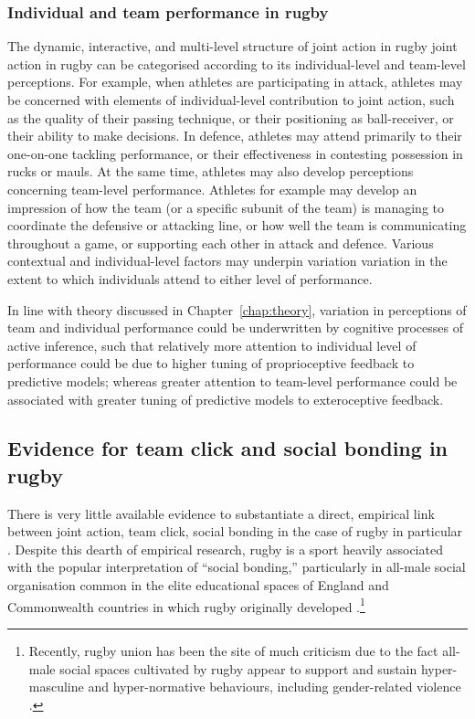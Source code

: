 \begin{CJK}{UTF8}{gbsn}
\subsubsection{Individual and team performance in rugby}

The dynamic, interactive, and multi-level structure of joint action in rugby  joint action in rugby can be categorised according to its individual-level and team-level perceptions.  For example, when athletes are participating in attack, athletes may be concerned with elements of individual-level contribution to joint action, such as the quality of their passing technique, or their positioning as ball-receiver, or their ability to make decisions.  In defence, athletes may attend primarily to their one-on-one tackling performance, or their effectiveness in contesting possession in rucks or mauls.  At the same time, athletes may also develop perceptions concerning team-level performance.  Athletes for example may develop an impression of how the team (or a specific subunit of the team) is managing to coordinate the defensive or attacking line, or how well the team is communicating throughout a game, or supporting each other in attack and defence.  Various contextual and individual-level factors may underpin variation variation in the extent to which individuals attend to either level of performance.

In line with theory discussed in Chapter~\ref{chap:theory}, variation in perceptions of team and individual performance could be underwritten by cognitive processes of active inference, such that relatively more attention to individual level of performance could be due to higher tuning of proprioceptive feedback to predictive models; whereas greater attention to team-level performance could be associated with greater tuning of predictive models to exteroceptive feedback.




\subsection{Evidence for team click and social bonding in rugby}
There is very little available evidence to substantiate a direct, empirical link between joint action, team click, social bonding in the case of rugby in particular \citep[but for a discussion, see][]{Davis2015}.  Despite this dearth of empirical research, rugby is a sport heavily associated with the popular interpretation of ``social bonding,'' particularly in all-male social organisation common in the elite educational spaces of England and Commonwealth countries in which rugby originally developed \citep{Dunning2005,Richards2007,Collins2008}.\footnote{Recently, rugby union has been the site of much criticism due to the fact all-male social spaces cultivated by rugby appear to support and sustain hyper-masculine and hyper-normative behaviours, including gender-related violence \citep{Cosslett2014}.}


\end{CJK}
